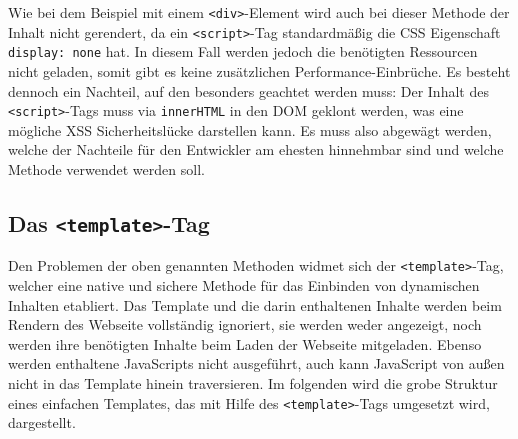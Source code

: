 Wie bei dem Beispiel mit einem \texttt{\textless{}div\textgreater{}}-Element wird auch bei dieser Methode der Inhalt nicht gerendert, da ein \texttt{\textless{}script\textgreater{}}-Tag standardmäßig die CSS Eigenschaft \texttt{display:\ none} hat. In diesem Fall werden jedoch die benötigten Ressourcen nicht geladen, somit gibt es keine zusätzlichen Performance-Einbrüche. Es besteht dennoch ein Nachteil, auf den besonders geachtet werden muss: Der Inhalt des \texttt{\textless{}script\textgreater{}}-Tags muss via \texttt{innerHTML} in den DOM geklont werden, was eine mögliche XSS Sicherheitslücke darstellen kann. Es muss also abgewägt werden, welche der Nachteile für den Entwickler am ehesten hinnehmbar sind und welche Methode verwendet werden soll.

\subsection{Das \texorpdfstring{\texttt{\textless{}template\textgreater{}}-Tag}{\textless{}template\textgreater{}-Tag}}\label{template-tag}

Den Problemen der oben genannten Methoden widmet sich der \texttt{\textless{}template\textgreater{}}-Tag, welcher eine native und sichere Methode für das Einbinden von dynamischen Inhalten etabliert. Das Template und die darin enthaltenen Inhalte werden beim Rendern des Webseite vollständig ignoriert, sie werden weder angezeigt, noch werden ihre benötigten Inhalte beim Laden der Webseite mitgeladen. Ebenso werden enthaltene JavaScripts nicht ausgeführt, auch kann JavaScript von außen nicht in das Template hinein traversieren. Im folgenden wird die grobe Struktur eines einfachen Templates, das mit Hilfe des \texttt{\textless{}template\textgreater{}}-Tags umgesetzt wird, dargestellt.

\begin{Shaded}
\begin{Highlighting}[]
\KeywordTok{>}
  \KeywordTok{>} 
  \KeywordTok{>}
\end{Highlighting}
\end{Shaded}


